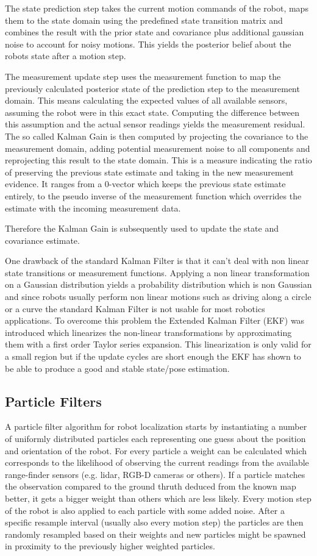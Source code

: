 \documentclass[10pt,journal,compsoc]{IEEEtran}
\begin{document}
The state prediction step takes the current motion commands of the robot, maps them to the state domain using the predefined state transition matrix and combines the result with the prior state and covariance plus additional gaussian noise to account for noisy motions. This yields the posterior belief about the robots state after a motion step.

The measurement update step uses the measurement function to map the previously calculated posterior state of the prediction step to the measurement domain. This means calculating the expected values of all available sensors, assuming the robot were in this exact state. Computing the difference between this assumption and the actual sensor readings yields the measurement residual.
The so called Kalman Gain is then computed by projecting the covariance to the measurement domain, adding potential measurement noise to all components and reprojecting this result to the state domain. This is a measure indicating the ratio of preserving the previous state estimate and taking in the new measurement evidence. It ranges from a 0-vector which keeps the previous state estimate entirely, to the pseudo inverse of the measurement function which overrides the estimate with the incoming measurement data.

Therefore the Kalman Gain is subsequently used to update the state and covariance estimate.

One drawback of the standard Kalman Filter is that it can't deal with non linear state transitions or measurement functions. Applying a non linear transformation on a Gaussian distribution yields a probability distribution which is non Gaussian and since robots usually perform non linear motions such as driving along a circle or a curve the standard Kalman Filter is not usable for most robotics applications.
To overcome this problem the Extended Kalman Filter (EKF) was introduced which linearizes the non-linear transformations by approximating them with a first order Taylor series expansion. This linearization is only valid for a small region but if the update cycles are short enough the EKF has shown to be able to produce a good and stable state/pose estimation.


\subsection{Particle Filters}
\label{sec:amcl}
A particle filter algorithm for robot localization starts by instantiating a number of uniformly distributed particles each representing one guess about the position and orientation of the robot. For every particle a weight can be calculated which corresponds to the likelihood of observing the current readings from the available range-finder sensors (e.g.  lidar, RGB-D cameras or others). If a particle matches the observation compared to the ground thruth deduced from the known map better, it gets a bigger weight than others which are less likely. Every motion step of the robot is also applied to each particle with some added noise. After a specific resample interval (usually also every motion step) the particles are then randomly resampled based on their weights and new particles might be spawned in proximity to the previously higher weighted particles. 
\end{document}
